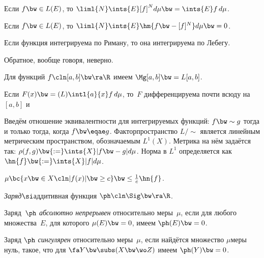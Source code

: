 \documentclass[a4paper]{article}
\begin{document}
\begin{note}
  Если $f \bw\in L(E)$, то $\liml{N}\ints{E}[f]^N d\mu \bw= \ints{E}f\,d\mu$.
\end{note}

\begin{theorem}
  Если $f \bw\in L(E)$, то $\liml{N}\ints{E}\hm{f \bw-[f]^N}d\mu \bw=0$.
\end{theorem}

\begin{stm}
  Если функция интегрируема по Риману, то она интегрируема по Лебегу.
\end{stm}
\begin{note}
  Обратное, вообще говоря, неверно.
\end{note}

\begin{theorem}
  Для функций $f\cln [a,b] \bw\ra \R$ имеем $\Mg[a,b] \bw= L[a,b]$.
\end{theorem}

\begin{imp}
  Если $F(x) \bw= (L)\intl{a}{x}f\,d\mu$, то~$F$ дифференцируема почти всюду на~$[a,b]$ и
\end{imp}

\begin{df}
  Введём отношение эквивалентности для интегрируемых функций: $f \bw\sim g$
  тогда и только тогда, когда $f \bw\eqae g$. Факторпространство $L/\!\!\sim$ является линейным
  метрическим пространством, обозначаемым $L^1(X)$.
  Метрика на нём задаётся так: $\rho(f,g) \bw{:=} \ints{X}|f \bw- g|d\mu$.
  Норма в $L^1$ определяется как $\hn{f} \bw{:=} \ints{X} |f|d\mu$.
\end{df}

\begin{lemma}
  $\mu\bc{x \bw\in X\cln |f(x)|\bw\ge c} \bw\le \frac1c\hn{f}$.
\end{lemma}

\begin{df}
  \emph{Заряд}\т $\si$\д аддитивная функция $\ph\cln\Sig \bw\ra \R$.
\end{df}

\begin{df}
  Заряд~$\ph$ \emph{абсолютно непрерывен} относительно меры~$\mu$,
  если для любого множества~$E$, для которого $\mu(E) \bw= 0$, имеем $\ph(E) \bw= 0$.
\end{df}

\begin{df}
  Заряд $\ph$ \emph{сингулярен} относительно меры~$\mu$, если найдётся множество $\mu$\д меры нуль,
  такое, что для $\fa Y \bw\subs (X \bw\wo Z)$ имеем $\ph(Y) \bw= 0$.
\end{df}
\end{document}
